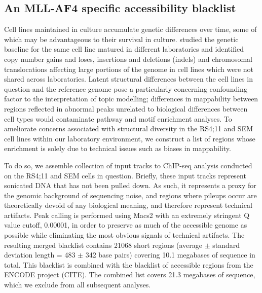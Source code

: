 \subsection{An MLL-AF4 specific accessibility blacklist} \label{mll_blacklist}

Cell lines maintained in culture accumulate genetic differences over time, some of which may be advantageous to their survival in culture. \cite{Liu2019}\textcite{Ben-David2018} studied the genetic baseline for the same cell line matured in different laboratories and identified copy number gains and loses, insertions and deletions (indels) and chromosomal translocations affecting large portions of the genome in cell lines which were not shared across laboratories. Latent structural differences between the cell lines in question and the reference genome pose a particularly concerning confounding factor to the interpretation of topic modelling; differences in mappability between regions reflected in abnormal peaks unrelated to biological differences between cell types would contaminate pathway and motif enrichment analyses. To ameliorate concerns associated with structural diversity in the RS4;11 and SEM cell lines within our laboratory environment, we construct a list of regions whose enrichment is solely due to technical issues such as biases in mappability.

To do so, we assemble collection of input tracks to ChIP-seq analysis conducted on the RS4;11 and SEM cells in question. Briefly, these input tracks represent sonicated DNA that has not been pulled down. As such, it represents a proxy for the genomic background of sequencing noise, and regions where pileups occur are theoretically devoid of any biological meaning, and therefore represent technical artifacts. Peak calling is performed using Macs2 with an extremely stringent Q value cutoff, 0.00001, in order to preserve as much of the accessible genome as possible while eliminating the most obvious signals of technical artifacts. The resulting merged blacklist contains 21068 short regions (average $\pm$ standard deviation length = 483 $\pm$ 342 base pairs) covering 10.1 megabases of sequence in total. This blacklist is combined with the blacklist of accessible regions from the ENCODE project (CITE). The combined list covers 21.3 megabases of sequence, which we exclude from all subsequent analyses.

